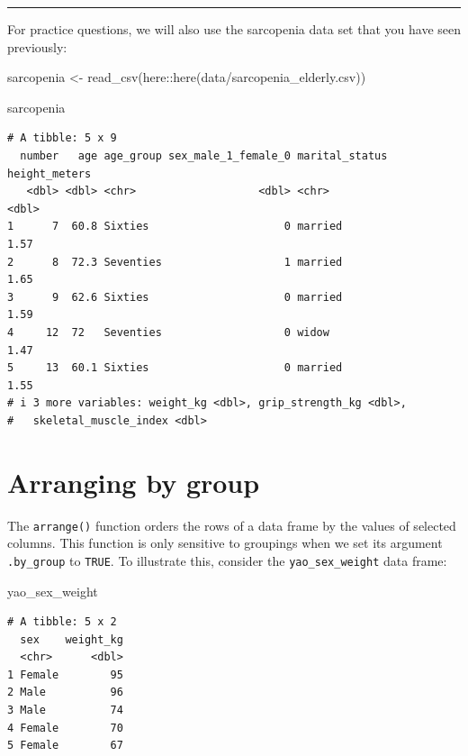 \documentclass[
  letterpaper,
  DIV=11,
  numbers=noendperiod]{scrreprt}
\newenvironment{Shaded}{\begin{snugshade}}{\end{snugshade}}
\newcommand{\FunctionTok}[1]{\textcolor[rgb]{0.28,0.35,0.67}{#1}}
\newcommand{\NormalTok}[1]{\textcolor[rgb]{0.00,0.23,0.31}{#1}}
\newcommand{\OtherTok}[1]{\textcolor[rgb]{0.00,0.23,0.31}{#1}}
\newcommand{\SpecialCharTok}[1]{\textcolor[rgb]{0.37,0.37,0.37}{#1}}
\newcommand{\StringTok}[1]{\textcolor[rgb]{0.13,0.47,0.30}{#1}}
\begin{document}
\begin{center}\rule{0.5\linewidth}{0.5pt}\end{center}

For practice questions, we will also use the sarcopenia data set that
you have seen previously:

\begin{Shaded}
\begin{Highlighting}[]
\NormalTok{sarcopenia }\OtherTok{\textless{}{-}} \FunctionTok{read\_csv}\NormalTok{(here}\SpecialCharTok{::}\FunctionTok{here}\NormalTok{(}\StringTok{\textquotesingle{}data/sarcopenia\_elderly.csv\textquotesingle{}}\NormalTok{))}

\NormalTok{sarcopenia}
\end{Highlighting}
\end{Shaded}

\begin{verbatim}
# A tibble: 5 x 9
  number   age age_group sex_male_1_female_0 marital_status height_meters
   <dbl> <dbl> <chr>                   <dbl> <chr>                  <dbl>
1      7  60.8 Sixties                     0 married                 1.57
2      8  72.3 Seventies                   1 married                 1.65
3      9  62.6 Sixties                     0 married                 1.59
4     12  72   Seventies                   0 widow                   1.47
5     13  60.1 Sixties                     0 married                 1.55
# i 3 more variables: weight_kg <dbl>, grip_strength_kg <dbl>,
#   skeletal_muscle_index <dbl>
\end{verbatim}

\section{Arranging by group}\label{arranging-by-group}

The \texttt{arrange()} function orders the rows of a data frame by the
values of selected columns. This function is only sensitive to groupings
when we set its argument \texttt{.by\_group} to \texttt{TRUE}. To
illustrate this, consider the \texttt{yao\_sex\_weight} data frame:

\begin{Shaded}
\begin{Highlighting}[]
\NormalTok{yao\_sex\_weight}
\end{Highlighting}
\end{Shaded}

\begin{verbatim}
# A tibble: 5 x 2
  sex    weight_kg
  <chr>      <dbl>
1 Female        95
2 Male          96
3 Male          74
4 Female        70
5 Female        67
\end{verbatim}
\end{document}
